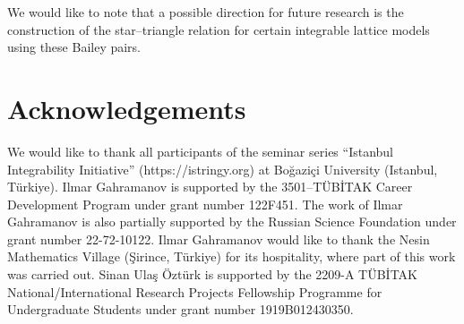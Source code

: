 \documentclass[11pt,a4paper]{article}
\begin{document}
We would like to note that a possible direction for future research is the construction of the star–triangle relation for certain integrable lattice models using these Bailey pairs.

\section*{Acknowledgements} 

We would like to thank all participants of the seminar series “Istanbul Integrability Initiative” (https://istringy.org) at Boğaziçi University (Istanbul, Türkiye). Ilmar Gahramanov is supported by the 3501–TÜBİTAK Career Development Program under grant number 122F451. The work of Ilmar Gahramanov is also partially supported by the Russian Science Foundation under grant number 22-72-10122. Ilmar Gahramanov would like to thank the Nesin Mathematics Village (Şirince, Türkiye) for its hospitality, where part of this work was carried out. Sinan Ulaş Öztürk is supported by the 2209-A TÜBİTAK National/International Research Projects Fellowship Programme for Undergraduate Students under grant number 1919B012430350.

	
\end{document}
